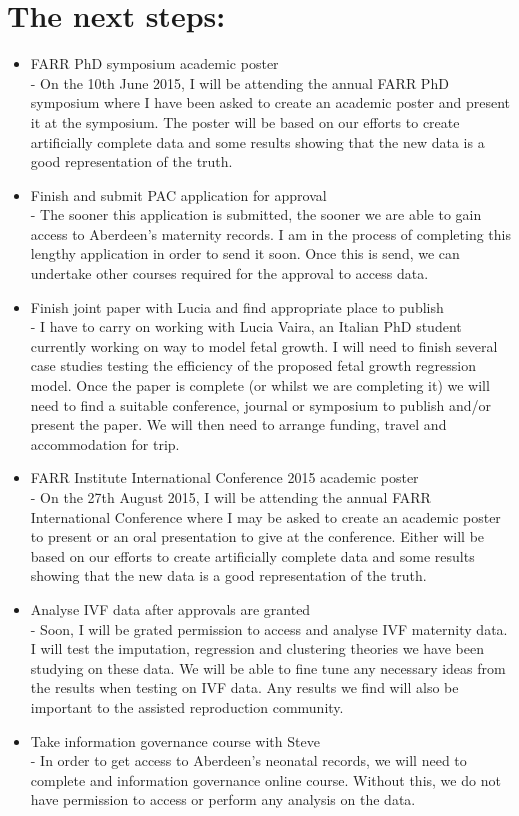 \documentclass[bsc]{abdnthesis}
\begin{document}
\section{The next steps:} %
\label{sec:immediate_things_to_do_}
\begin{itemize}
	\item FARR PhD symposium academic poster \\ - On the 10th June 2015, I will be attending the annual FARR PhD symposium where I have been asked to create an academic poster and present it at the symposium. The poster will be based on our efforts to create artificially complete data and some results showing that the new data is a good representation of the truth.
	\item Finish and submit PAC application for approval \\ - The sooner this application is submitted, the sooner we are able to gain access to Aberdeen's maternity records. I am in the process of completing this lengthy application in order to send it soon. Once this is send, we can undertake other courses required for the approval to access data. 
	\item Finish joint paper with Lucia and find appropriate place to publish \\ - I have to carry on working with Lucia Vaira, an Italian PhD student currently working on way to model fetal growth. I will need to finish several case studies testing the efficiency of the proposed fetal growth regression model. Once the paper is complete (or whilst we are completing it) we will need to find a suitable conference, journal or symposium to publish and/or present the paper. We will then need to arrange funding, travel and accommodation for trip.
	\item FARR Institute International Conference 2015 academic poster \\ - On the 27th August 2015, I will be attending the annual FARR International Conference where I may be asked to create an academic poster to present or an oral presentation to give at the conference. Either will be based on our efforts to create artificially complete data and some results showing that the new data is a good representation of the truth.
	\item Analyse IVF data after approvals are granted \\ - Soon, I will be grated permission to access and analyse IVF maternity data. I will test the imputation, regression and clustering theories we have been studying on these data. We will be able to fine tune any necessary ideas from the results when testing on IVF data. Any results we find will also be important to the assisted reproduction community. 	
	\item Take information governance course with Steve \\ - In order to get access to Aberdeen's neonatal records, we will need to complete and information governance online course. Without this, we do not have permission to access or perform any analysis on the data.  
\end{itemize}








\end{document}

